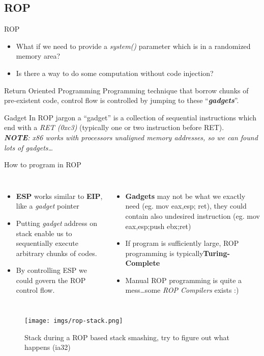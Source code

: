 \subsection{ROP}
\begin{frame}{ROP}

\begin{itemize}
\item What if we need to provide a \emph{system()} parameter  which is in a randomized memory area?
\item Is there a way to do some computation without code injection?
\end{itemize}

\begin{block}{Return Oriented Programming}
Programming technique that borrow chunks of pre-existent code, control flow is controlled by jumping to these ``{\bf \emph{gadgets}}''.
\end{block}

\begin{block}{Gadget}
In ROP jargon a ``gadget'' is a collection of sequential instructions which end with a \emph{RET (0xc3)} (typically one or two instruction before RET).\\
\emph{{\bf NOTE}: x86 works with processors unaligned memory addresses, so we can found lots of gadgets\ldots}
\end{block}

\framebreak 

\begin{block}{How to program in ROP}
\begin{columns}[c] 
    \begin{itemize}
    \item {\bf ESP} works similar to {\bf EIP}, like a \emph{gadget} pointer
   	\item Putting \emph{gadget} address on stack enable us to sequentially execute arbitrary chunks of codes.
   	\item By controlling ESP we could govern the ROP control flow.
	\end{itemize}     
    \begin{itemize}
    \item {\bf Gadgets} may not be what we exactly need (eg. mov eax,esp; ret), they could contain also undesired instruction (eg. mov eax,esp;push ebx;ret)
    \item If program is sufficiently large, ROP programming is typically{\bf Turing-Complete}
    \item Manual ROP programming is quite a mess\ldots some \emph{ROP Compilers} exists :)
	\end{itemize}
\end{columns}
\end{block}

\framebreak

	\begin{figure}
        \texttt{[image: imgs/rop-stack.png]}
        \label{fig:rop-stack}
        \caption{Stack during a ROP based stack smashing, try to figure out what happens (ia32)}
    \end{figure}

\end{frame}
